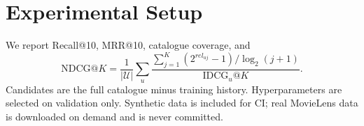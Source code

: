 \section{Experimental Setup}
We report Recall@10, MRR@10, catalogue coverage, and
\[
\mathrm{NDCG}@K=\frac{1}{|\mathcal U|}\sum_u
\frac{\sum_{j=1}^K(2^{rel_{uj}}-1)/\log_2(j+1)}
{\mathrm{IDCG}_u@K}.
\]
Candidates are the full catalogue minus training history. Hyperparameters are
selected on validation only. Synthetic data is included for CI; real
MovieLens data is downloaded on demand and is never committed.
